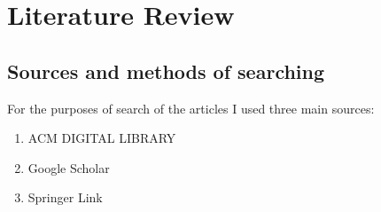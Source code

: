 \chapter{Literature Review}
\label{chap:lr}



\section{Sources and methods of searching}
For the purposes of search of the articles I used three main sources: 
\begin{enumerate}
    \item ACM DIGITAL LIBRARY
    \item Google Scholar
    \item Springer Link
\end{enumerate}

